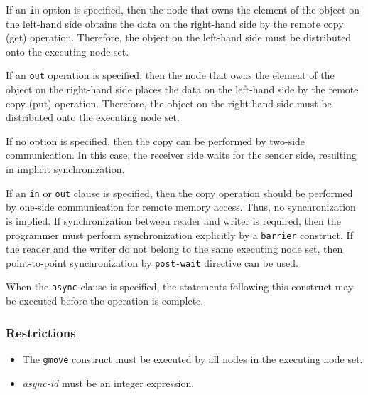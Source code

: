 If an {\tt in} option is specified, then the node that owns the element of
the object on the left-hand side obtains the data on the right-hand side by the 
remote copy (get) operation. Therefore, the object on the left-hand side
must be distributed onto the executing node set. 

If an {\tt out} operation is specified, then the node that owns the element
of the object on the right-hand side places the data on the left-hand side by the
remote copy (put) operation. Therefore, the object on the right-hand side
must be distributed onto the executing node set.

If no option is specified, then the copy can be performed by two-side
communication. In this case, the receiver side waits for the sender side,
resulting in implicit synchronization. 

If an {\tt in} or {\tt out} clause is specified, then the
copy operation should be performed by one-side communication for remote
memory access. Thus, no synchronization is implied. If
synchronization between reader and writer is required, then the programmer
must perform synchronization explicitly by a {\tt barrier} construct. If the reader
and the writer do not belong to the same executing node set, then
point-to-point synchronization by {\tt post-wait} directive can be used.

When the {\tt async} clause is specified, the statements following this
construct may be executed before the operation is complete.

\subsubsection*{Restrictions}

\begin{itemize}
\item The {\tt gmove} construct must be executed by all nodes in the
  executing node set.
\item {\it async-id} must be an integer expression.
\end{itemize}

